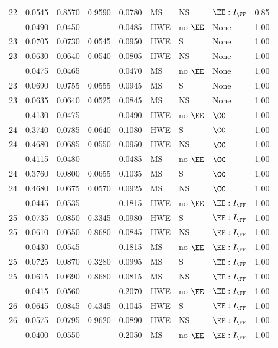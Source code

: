 \begin{longtable}[t]{lllllllll}
22 & 0.0545 & 0.8570 & 0.9590 & 0.0780 & MS & NS & $\EE:I_{\FF}$ & 0.85\\
\addlinespace
23 & 0.0490 & 0.0450 &  & 0.0485 & HWE & no $\EE$ & None & 1.00\\
23 & 0.0705 & 0.0730 & 0.0545 & 0.0950 & HWE & S & None & 1.00\\
23 & 0.0630 & 0.0640 & 0.0540 & 0.0805 & HWE & NS & None & 1.00\\
\addlinespace
23 & 0.0475 & 0.0465 &  & 0.0470 & MS & no $\EE$ & None & 1.00\\
23 & 0.0690 & 0.0755 & 0.0555 & 0.0945 & MS & S & None & 1.00\\
23 & 0.0635 & 0.0640 & 0.0525 & 0.0845 & MS & NS & None & 1.00\\
\addlinespace
24 & 0.4130 & 0.0475 &  & 0.0490 & HWE & no $\EE$ & $\CC$ & 1.00\\
24 & 0.3740 & 0.0785 & 0.0640 & 0.1080 & HWE & S & $\CC$ & 1.00\\
24 & 0.4680 & 0.0685 & 0.0550 & 0.0950 & HWE & NS & $\CC$ & 1.00\\
\addlinespace
24 & 0.4115 & 0.0480 &  & 0.0485 & MS & no $\EE$ & $\CC$ & 1.00\\
24 & 0.3760 & 0.0800 & 0.0655 & 0.1035 & MS & S & $\CC$ & 1.00\\
24 & 0.4680 & 0.0675 & 0.0570 & 0.0925 & MS & NS & $\CC$ & 1.00\\
\addlinespace
25 & 0.0445 & 0.0535 &  & 0.1815 & HWE & no $\EE$ & $\EE:I_{\FF}$ & 1.00\\
25 & 0.0735 & 0.0850 & 0.3345 & 0.0980 & HWE & S & $\EE:I_{\FF}$ & 1.00\\
25 & 0.0610 & 0.0650 & 0.8680 & 0.0845 & HWE & NS & $\EE:I_{\FF}$ & 1.00\\
\addlinespace
25 & 0.0430 & 0.0545 &  & 0.1815 & MS & no $\EE$ & $\EE:I_{\FF}$ & 1.00\\
25 & 0.0725 & 0.0870 & 0.3280 & 0.0995 & MS & S & $\EE:I_{\FF}$ & 1.00\\
25 & 0.0615 & 0.0690 & 0.8680 & 0.0815 & MS & NS & $\EE:I_{\FF}$ & 1.00\\
\addlinespace
26 & 0.0415 & 0.0560 &  & 0.2070 & HWE & no $\EE$ & $\EE:I_{\FF}$ & 1.00\\
26 & 0.0645 & 0.0845 & 0.4345 & 0.1045 & HWE & S & $\EE:I_{\FF}$ & 1.00\\
26 & 0.0575 & 0.0795 & 0.9620 & 0.0890 & HWE & NS & $\EE:I_{\FF}$ & 1.00\\
\addlinespace
26 & 0.0400 & 0.0550 &  & 0.2050 & MS & no $\EE$ & $\EE:I_{\FF}$ & 1.00\\

\end{longtable}

